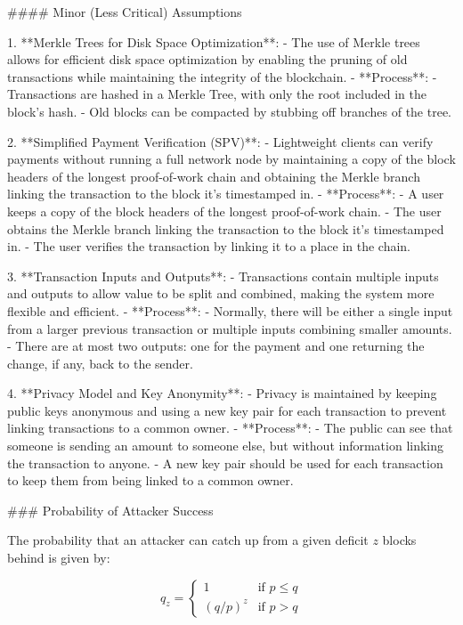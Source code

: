 #### Minor (Less Critical) Assumptions

1. **Merkle Trees for Disk Space Optimization**:
   - The use of Merkle trees allows for efficient disk space optimization by enabling the pruning of old transactions while maintaining the integrity of the blockchain.
   - **Process**:
     - Transactions are hashed in a Merkle Tree, with only the root included in the block's hash.
     - Old blocks can be compacted by stubbing off branches of the tree.

2. **Simplified Payment Verification (SPV)**:
   - Lightweight clients can verify payments without running a full network node by maintaining a copy of the block headers of the longest proof-of-work chain and obtaining the Merkle branch linking the transaction to the block it's timestamped in.
   - **Process**:
     - A user keeps a copy of the block headers of the longest proof-of-work chain.
     - The user obtains the Merkle branch linking the transaction to the block it's timestamped in.
     - The user verifies the transaction by linking it to a place in the chain.

3. **Transaction Inputs and Outputs**:
   - Transactions contain multiple inputs and outputs to allow value to be split and combined, making the system more flexible and efficient.
   - **Process**:
     - Normally, there will be either a single input from a larger previous transaction or multiple inputs combining smaller amounts.
     - There are at most two outputs: one for the payment and one returning the change, if any, back to the sender.

4. **Privacy Model and Key Anonymity**:
   - Privacy is maintained by keeping public keys anonymous and using a new key pair for each transaction to prevent linking transactions to a common owner.
   - **Process**:
     - The public can see that someone is sending an amount to someone else, but without information linking the transaction to anyone.
     - A new key pair should be used for each transaction to keep them from being linked to a common owner.

### Probability of Attacker Success

The probability that an attacker can catch up from a given deficit \( z \) blocks behind is given by:

\[
q_z = \begin{cases}
1 & \text{if } p \leq q \\
(q/p)^z & \text{if } p > q
\end{cases}
\]

